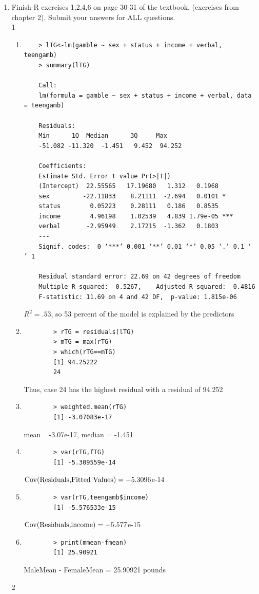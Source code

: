 \documentclass[11pt]{article}
\newcommand{\Cov}{\mathop{\rm Cov}}
\begin{document}
\begin{enumerate}
\item  Finish R exercises 1,2,4,6 on page 30-31 of the textbook.  (exercises from chapter 2).  Submit your answers for {\color{red}ALL} questions.\\
1
\begin{enumerate}

	\item 
		\begin{verbatim}
	> lTG<-lm(gamble ~ sex + status + income + verbal, teengamb)
	> summary(lTG)
	
	Call:
	lm(formula = gamble ~ sex + status + income + verbal, data = teengamb)
	
	Residuals:
	Min      1Q  Median      3Q     Max 
	-51.082 -11.320  -1.451   9.452  94.252 
	
	Coefficients:
	Estimate Std. Error t value Pr(>|t|)    
	(Intercept)  22.55565   17.19680   1.312   0.1968    
	sex         -22.11833    8.21111  -2.694   0.0101 *  
	status        0.05223    0.28111   0.186   0.8535    
	income        4.96198    1.02539   4.839 1.79e-05 ***
	verbal       -2.95949    2.17215  -1.362   0.1803    
	---
	Signif. codes:  0 ‘***’ 0.001 ‘**’ 0.01 ‘*’ 0.05 ‘.’ 0.1 ‘ ’ 1
	
	Residual standard error: 22.69 on 42 degrees of freedom
	Multiple R-squared:  0.5267,	Adjusted R-squared:  0.4816 
	F-statistic: 11.69 on 4 and 42 DF,  p-value: 1.815e-06
	\end{verbatim}
	$R^2=.53$, so 53 percent of the model is explained by the predictors
	\item
	\begin{verbatim}
		> rTG = residuals(lTG)
		> mTG = max(rTG)
		> which(rTG==mTG)
		[1] 94.25222
		24 
	\end{verbatim} 
	Thus, case 24 has the highest residual with a residual of 94.252
	\item 
	\begin{verbatim}
		> weighted.mean(rTG)
		[1] -3.07083e-17
	\end{verbatim}mean ~ -3.07e-17, median = -1.451
	\item
	\begin{verbatim}
		> var(rTG,fTG)
		[1] -5.309559e-14
	\end{verbatim} 
	$\Cov(\text{Residuals,Fitted Values}) = -5.3096$e-14
	\item 
	\begin{verbatim}
		> var(rTG,teengamb$income)
		[1] -5.576533e-15
	\end{verbatim}
	$\Cov(\text{Residuals,income}) = -5.577$e-15
	\item 
	\begin{verbatim}
		> print(mmean-fmean)
		[1] 25.90921
	\end{verbatim}
	MaleMean - FemaleMean = 25.90921 pounds
\end{enumerate}
2
\begin{enumerate}
	

\end{enumerate}
\end{enumerate}
\end{document}
